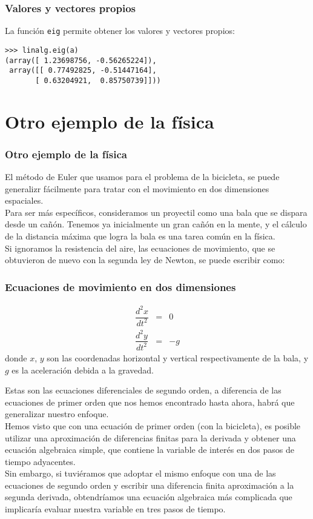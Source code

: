 \begin{frame}[fragile]
\frametitle{Valores y vectores propios}
La función \texttt{eig} permite obtener los valores y vectores propios:
\begin{exampleblock}{}
\verb|>>> linalg.eig(a)| \\
\verb|(array([ 1.23698756, -0.56265224]),| \\
\verb| array([[ 0.77492825, -0.51447164],| \\
\verb|       [ 0.63204921,  0.85750739]]))|
\end{exampleblock}
\end{frame}
\section{Otro ejemplo de la física}
\begin{frame}
\frametitle{Otro ejemplo de la física}
El método de Euler que usamos para el problema de la bicicleta, se puede generalizr fácilmente para tratar con el movimiento en dos dimensiones espaciales.
\\
\medskip
Para ser más específicos, consideramos un proyectil como una bala que se dispara desde un cañón. Tenemos ya inicialmente un gran cañón en la mente, y el cálculo de la distancia máxima que logra la bala es una tarea común en la física.
\\
\medskip
Si ignoramos la resistencia del aire, las ecuaciones de movimiento, que se obtuvieron de nuevo con la segunda ley de Newton, se puede escribir como:
\end{frame}
\begin{frame}
\frametitle{Ecuaciones de movimiento en dos dimensiones}
\begin{eqnarray*}
\dfrac{d^{2}x}{dt^{2}} &=& 0 \\
\dfrac{d^{2}y}{dt^{2}} &=& -g
\end{eqnarray*}
donde $x$, $y$ son las coordenadas horizontal y vertical respectivamente de la bala, y $g$ es la aceleración debida a la gravedad.
\end{frame}
\begin{frame}
Estas son las ecuaciones diferenciales de segundo orden, a diferencia de las ecuaciones de primer orden que nos hemos encontrado hasta ahora, habrá que generalizar nuestro enfoque.
\\
\medskip
Hemos visto que con una ecuación de primer orden (con la bicicleta), es posible utilizar una aproximación de diferencias finitas para la derivada y obtener una ecuación algebraica simple, que contiene la variable de interés en dos pasos de tiempo adyacentes.
\\
\medskip
Sin embargo, si tuviéramos que adoptar el mismo enfoque con una de las ecuaciones de segundo orden y escribir una diferencia finita aproximación a la segunda derivada, obtendríamos una ecuación algebraica más complicada que implicaría evaluar nuestra variable en tres pasos de tiempo.
\end{frame}
